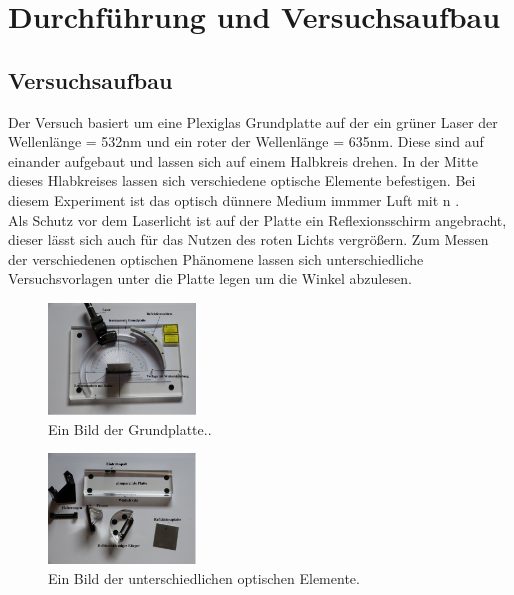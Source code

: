 \newpage
\section{Durchführung und Versuchsaufbau}

    \subsection{Versuchsaufbau}
        
        Der Versuch basiert um eine Plexiglas Grundplatte auf der ein grüner Laser der Wellenlänge \lambda = 532nm und ein roter der Wellenlänge 
        \lambda = 635nm. Diese sind auf einander aufgebaut und lassen sich auf einem Halbkreis drehen. In der Mitte dieses Hlabkreises lassen sich 
        verschiedene optische Elemente befestigen. Bei diesem Experiment ist das optisch dünnere Medium immmer Luft mit n .\\
        Als Schutz vor dem Laserlicht ist auf der Platte ein Reflexionsschirm angebracht, dieser lässt sich auch für das Nutzen des roten Lichts 
        vergrößern. Zum Messen der verschiedenen optischen Phänomene lassen sich unterschiedliche Versuchsvorlagen unter die Platte legen um die 
        Winkel abzulesen.

        \begin{figure}[H]
            \centering
            \includegraphics[width=0.35\textwidth]{latex/images/D1.PNG}
            \caption{Ein Bild der Grundplatte.\protect \cite{400}.}
        \end{figure}

        \begin{figure}[H]
            \centering
            \includegraphics[width=0.35\textwidth]{latex/images/D2.PNG}
            \caption{Ein Bild der unterschiedlichen optischen Elemente\protect \cite{400}.}
            \label{img:object}
        \end{figure}
        
